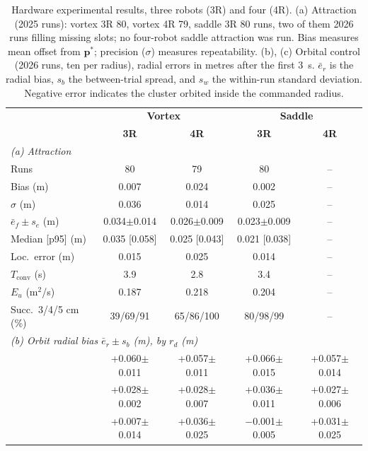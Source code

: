 \documentclass[lettersize,journal]{IEEEtran}
\newcommand{\rev}[1]{#1}
\begin{document}
\begin{table}[!t]
    \scriptsize
    \centering
    \caption{Hardware experimental results, three robots (3R) and four (4R). (a) Attraction (2025 runs): vortex 3R \rev{80}, vortex 4R \rev{79}, saddle 3R \rev{80} runs, two of them 2026 runs filling missing slots; no four-robot saddle attraction was run. Bias measures mean offset from $\mathbf{p}^*$; precision ($\sigma$) measures repeatability. (b), (c) Orbital control (2026 runs, ten per radius), radial errors in metres after the first \rev{3}~s. $\bar e_r$ is the radial bias, $s_b$ the between-trial spread, and $s_w$ the within-run standard deviation. Negative error indicates the cluster orbited inside the commanded radius.}
    \label{tab:estimation_results}\label{tab:orbital_radius_comparison}
    \setlength{\tabcolsep}{1.5pt}
    \rev{\begin{tabular}{l|cc|cc}
\hline
 & \multicolumn{2}{c|}{\textbf{Vortex}} & \multicolumn{2}{c}{\textbf{Saddle}} \\
 & \textbf{3R} & \textbf{4R} & \textbf{3R} & \textbf{4R} \\
\hline
\multicolumn{5}{l}{\textit{(a) Attraction}} \\
\hline
Runs & 80 & 79 & 80 & -- \\
Bias (m) & 0.007 & 0.024 & 0.002 & -- \\
$\sigma$ (m) & 0.036 & 0.014 & 0.025 & -- \\
$\bar{e}_f \pm s_e$ (m) & 0.034$\pm$0.014 & 0.026$\pm$0.009 & 0.023$\pm$0.009 & -- \\
Median [p95] (m) & 0.035 [0.058] & 0.025 [0.043] & 0.021 [0.038] & -- \\
Loc.\ error (m) & 0.015 & 0.025 & 0.014 & -- \\
$T_{\mathrm{conv}}$ (s) & 3.9 & 2.8 & 3.4 & -- \\
$E_u$ (m$^2$/s) & 0.187 & 0.218 & 0.204 & -- \\
Succ.\ 3/4/5 cm (\%) & 39/69/91 & 65/86/100 & 80/98/99 & -- \\
\hline
\multicolumn{5}{l}{\textit{(b) Orbit radial bias $\bar e_r \pm s_b$ (m), by $r_d$ (m)}} \\
\hline
\quad 0.01 & +0.060$\pm$0.011 & +0.057$\pm$0.011 & +0.066$\pm$0.015 & +0.057$\pm$0.014 \\
\quad 0.10 & +0.028$\pm$0.002 & +0.028$\pm$0.007 & +0.036$\pm$0.011 & +0.027$\pm$0.006 \\
\quad 0.20 & +0.007$\pm$0.014 & +0.036$\pm$0.025 & $-$0.001$\pm$0.005 & +0.031$\pm$0.025 \\

\end{tabular}}
\end{table}
\end{document}

